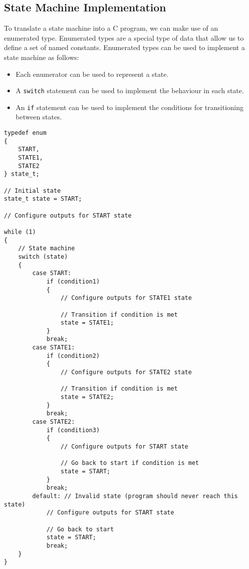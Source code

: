 \documentclass{article}
\begin{document}
\subsection{State Machine Implementation}
To translate a state machine into a C program, we can make use of an
enumerated type. Enumerated types are a special type of data that allow
us to define a set of named constants. Enumerated types can be used to
implement a state machine as follows:
\begin{itemize}
    \item Each enumerator can be used to represent a state.
    \item A \texttt{switch} statement can be used to implement
          the behaviour in each state.
    \item An \texttt{if} statement can be used to implement the
          conditions for transitioning between states.
\end{itemize}
\begin{verbatim}
typedef enum
{
    START,
    STATE1,
    STATE2
} state_t;

// Initial state
state_t state = START;

// Configure outputs for START state

while (1)
{
    // State machine
    switch (state)
    {
        case START:
            if (condition1)
            {
                // Configure outputs for STATE1 state

                // Transition if condition is met
                state = STATE1;
            }
            break;
        case STATE1:
            if (condition2)
            {
                // Configure outputs for STATE2 state

                // Transition if condition is met
                state = STATE2;
            }
            break;
        case STATE2:
            if (condition3)
            {
                // Configure outputs for START state

                // Go back to start if condition is met
                state = START;
            }
            break;
        default: // Invalid state (program should never reach this state)
            // Configure outputs for START state

            // Go back to start
            state = START;
            break;
    }
}
\end{verbatim}
\end{document}
